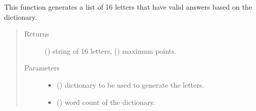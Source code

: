 \documentclass[letterpaper,10pt,english,openany,oneside]{sphinxmanual}
\begin{document}

\begin{fulllineitems}
\label{\detokenize{index:combine.init_letters}}
This function generates a list of 16 letters that have valid 
answers based on the dictionary.
\begin{quote}\begin{description}
\item[{Returns}] \leavevmode
() string of 16 letters, () maximum points.

\item[{Parameters}] \leavevmode\begin{itemize}
\item {} 
 () \textendash{} dictionary to be used to generate the letters.

\item {} 
 () \textendash{} word count of the dictionary.

\end{itemize}

\end{description}\end{quote}

\end{fulllineitems}

\end{document}
